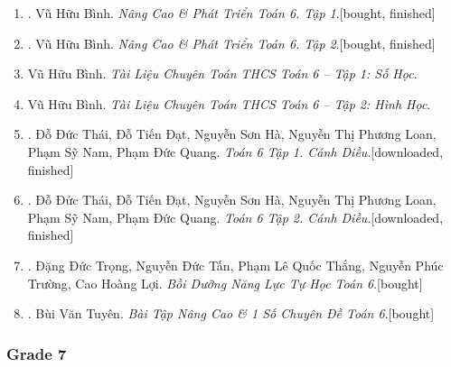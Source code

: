 \documentclass{article}
\begin{document}
\begin{enumerate}
	\item \cite{Binh_Toan_6_tap_1}. Vũ Hữu Bình. \textit{Nâng Cao \& Phát Triển Toán 6. Tập 1}.\hfill\textsf{[bought, finished]}
	\item \cite{Binh_Toan_6_tap_2}. Vũ Hữu Bình. \textit{Nâng Cao \& Phát Triển Toán 6. Tập 2}.\hfill\textsf{[bought, finished]}
	\item Vũ Hữu Bình. \textit{Tài Liệu Chuyên Toán THCS Toán 6 -- Tập 1: Số Học}.
	\item Vũ Hữu Bình. \textit{Tài Liệu Chuyên Toán THCS Toán 6 -- Tập 2: Hình Học}.
	\item \cite{SGK_Toan_6_Canh_Dieu_tap_1}. Đỗ Đức Thái, Đỗ Tiến Đạt, Nguyễn Sơn Hà, Nguyễn Thị Phương Loan, Phạm Sỹ Nam, Phạm Đức Quang. \textit{Toán 6 Tập 1. Cánh Diều}.\hfill\textsf{[downloaded, finished]}
	\item \cite{SGK_Toan_6_Canh_Dieu_tap_2}. Đỗ Đức Thái, Đỗ Tiến Đạt, Nguyễn Sơn Hà, Nguyễn Thị Phương Loan, Phạm Sỹ Nam, Phạm Đức Quang. \textit{Toán 6 Tập 2. Cánh Diều}.\hfill\textsf{[downloaded, finished]}
	\item \cite{Trong_Toan_6_2021}. Đặng Đức Trọng, Nguyễn Đức Tấn, Phạm Lê Quốc Thắng, Nguyễn Phúc Trường, Cao Hoàng Lợi. \textit{Bồi Dưỡng Năng Lực Tự Học Toán 6}.\hfill\textsf{[bought]}
	\item \cite{Tuyen_Toan_6}. Bùi Văn Tuyên. \textit{Bài Tập Nâng Cao \& 1 Số Chuyên Đề Toán 6}.\hfill\textsf{[bought]}
\end{enumerate}

\subsubsection{Grade 7}
	
\end{document}
